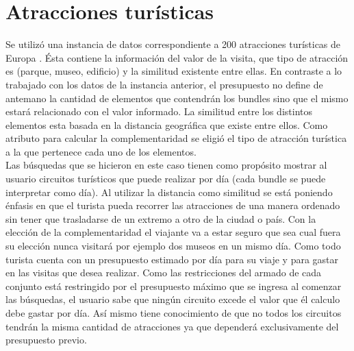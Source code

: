 \section{Atracciones turísticas}
Se utilizó una instancia de datos correspondiente a 200 atracciones turísticas de Europa \cite{turisticAtraction}. Ésta contiene la información del valor de la visita, que tipo de atracción es (parque, museo, edificio) y la similitud existente entre ellas. En contraste a lo trabajado con los datos de la instancia anterior, el presupuesto no define de antemano la cantidad de elementos que contendrán los bundles sino que el mismo estará relacionado con el valor informado. La similitud entre los distintos elementos esta basada en la distancia geográfica que existe entre ellos. Como atributo para calcular la complementaridad se eligió el tipo de atracción turística a la que pertenece cada uno de los elementos.\\

Las búsquedas que se hicieron en este caso tienen como propósito mostrar al usuario circuitos turísticos que puede realizar por día (cada bundle se puede interpretar como día). Al utilizar la distancia como similitud se está poniendo énfasis en que el turista pueda recorrer las atracciones de una manera ordenado sin tener que trasladarse de un extremo a otro de la ciudad o país. Con la elección de la complementaridad el viajante va a estar seguro que sea cual fuera su elección nunca visitará por ejemplo dos museos en un mismo día. Como todo turista cuenta con un presupuesto estimado por día para su viaje y para gastar en las visitas que desea realizar. Como las restricciones del armado de cada conjunto está restringido por el presupuesto máximo que se ingresa al comenzar las búsquedas, el usuario sabe que ningún circuito excede el valor que él calculo debe gastar por día. Así mismo tiene conocimiento de que no todos los circuitos tendrán la misma cantidad de atracciones ya que dependerá exclusivamente del presupuesto previo.
